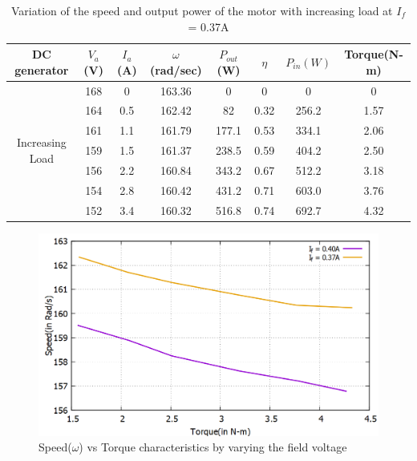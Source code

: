 \documentclass[12pt]{article}
\begin{document}
                \begin{table}[H]
                    \centering
                    \begin{tabular}{|c|c|c|c|c|c|c|c|}
                         \hline
                         \hline
                        DC generator & $V_a$(V) & $I_a$(A) & $\omega$(rad/sec) & $P_{out}$(W) & $\eta$ & $P_{in}(W)$ & Torque(N-m) \\
                        \hline
                        \multirow{8}{5em}{Increasing Load} & 168 & 0 & 163.36 & 0 & 0 & 0 & 0\\
                                & 164 & 0.5 & 162.42 & 82 & 0.32 & 256.2 & 1.57\\
                                & 161 & 1.1 & 161.79 & 177.1 & 0.53 & 334.1 & 2.06 \\
                                & 159 & 1.5 & 161.37 & 238.5 & 0.59 & 404.2 & 2.50\\
                                & 156 & 2.2 & 160.84 & 343.2 & 0.67 & 512.2 & 3.18\\
                                & 154 & 2.8 & 160.42 & 431.2 & 0.71 & 603.0 & 3.76\\
                                & 152 & 3.4 & 160.32 & 516.8 & 0.74 & 692.7 & 4.32\\
                             \hline
                             \hline
                    \end{tabular}
                    \caption{Variation of the speed and output power of the motor with increasing load at $I_f$ = 0.37A}
                    \label{tab:my_label}
                \end{table}
                \begin{figure}[H]
                    \centering    \includegraphics[scale=0.5]{LAB-4/field.png}
                    \caption{Speed($\omega$) vs Torque characteristics by varying the field voltage}
                    \label{fig:my_label}
                \end{figure}
\end{document}
